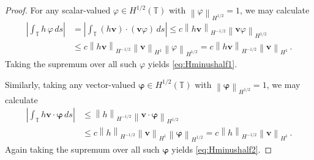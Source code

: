 \documentclass[11pt,reqno]{amsart}
\newcommand{\T}{\mathbb{T}}
\newcommand{\bv}{\bm{v}}
\newcommand{\abs}[1]{\left\lvert #1 \right\rvert}
\newcommand{\norm}[1]{\left\lVert #1 \right\rVert}
\numberwithin{equation}{section}
\theoremstyle{definition}
\begin{document}
\begin{proof}
For any scalar-valued $\varphi\in H^{1/2}(\T)$ with $\norm{\varphi}_{H^{1/2}}=1$, we may calculate
\begin{equation}
\begin{aligned}
  \abs{\int_\T h\,\varphi\,ds} &= \abs{\int_\T (h\bv)\cdot(\bv\varphi)\,ds}
  \le c\norm{h\bv}_{H^{-1/2}}\norm{\bv\varphi}_{H^{1/2}}\\
  &\le c\norm{h\bv}_{H^{-1/2}}\norm{\bv}_{H^1}\norm{\varphi}_{H^{1/2}}
  = c\norm{h\bv}_{H^{-1/2}}\norm{\bv}_{H^1}\,.
\end{aligned}
\end{equation}
Taking the supremum over all such $\varphi$ yields \eqref{eq:Hminushalf1}. 


Similarly, taking any vector-valued $\bm{\varphi}\in H^{1/2}(\T)$ with $\norm{\bm{\varphi}}_{H^{1/2}}=1$, we may calculate 
\begin{equation}
\begin{aligned}
  \abs{\int_\T h\bv\cdot\bm{\varphi} \,ds}
  &\le \norm{h}_{H^{-1/2}}\norm{\bv\cdot\bm{\varphi}}_{H^{1/2}}\\
  &\le c\norm{h}_{H^{-1/2}}\norm{\bv}_{H^1}\norm{\bm{\varphi}}_{H^{1/2}}
  = c\norm{h}_{H^{-1/2}}\norm{\bv}_{H^1}\,.
\end{aligned}
\end{equation}
Again taking the supremum over all such $\bm{\varphi}$ yields \eqref{eq:Hminushalf2}.
\end{proof}



\end{document}
